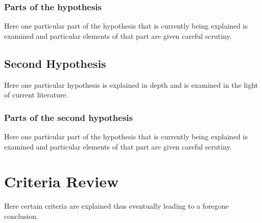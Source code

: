 \subsubsection{Parts of the hypothesis}

Here one particular part of the hypothesis that is
currently being explained is examined and particular
elements of that part are given careful scrutiny.


\subsection{Second Hypothesis}

Here one particular hypothesis is explained in depth
and is examined in the light of current literature.

\subsubsection{Parts of the second hypothesis}

Here one particular part of the hypothesis that is
currently being explained is examined and particular
elements of that part are given careful scrutiny.

\section{Criteria Review}

Here certain criteria are explained thus eventually
leading to a foregone conclusion.
